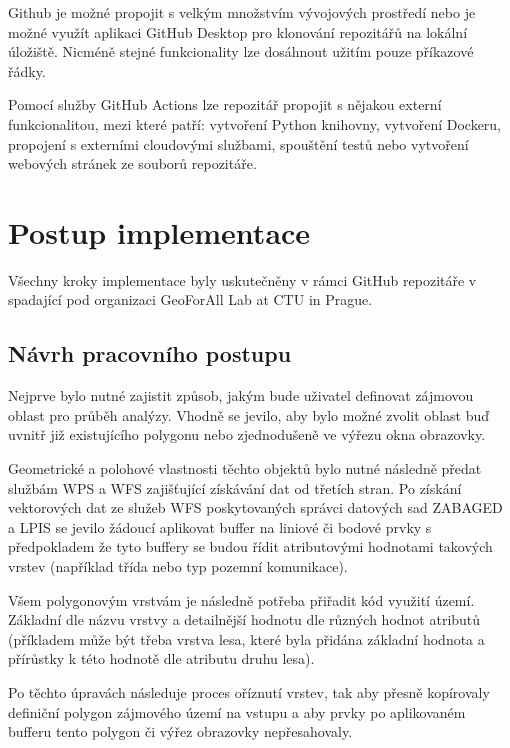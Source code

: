 \documentclass[a4paper,oneside,12pt]{book}
\begin{document}
\hspace{10mm}Github je možné propojit s velkým množstvím vývojových prostředí nebo je možné využít aplikaci GitHub Desktop pro klonování repozitářů na lokální úložiště. Nicméně stejné funkcionality lze dosáhnout užitím pouze
příkazové řádky. 

\hspace{10mm}Pomocí služby GitHub Actions lze repozitář propojit s nějakou externí funkcionalitou, mezi které patří: vytvoření Python knihovny, vytvoření Dockeru, propojení s externími cloudovými službami, spouštění testů nebo vytvoření webových stránek ze souborů repozitáře. 


\chapter{Postup implementace} \label{implementace}
\hspace{10mm}Všechny kroky implementace byly uskutečněny v rámci GitHub repozitáře v spadající pod organizaci GeoForAll Lab at CTU in Prague.

\section{Návrh pracovního postupu} \label{workflow}
\hspace{10mm}Nejprve bylo nutné zajistit způsob, jakým bude uživatel definovat zájmovou oblast pro průběh analýzy. Vhodně se jevilo, aby bylo možné zvolit oblast buď uvnitř již existujícího polygonu nebo zjednodušeně ve výřezu okna obrazovky.

\hspace{10mm}Geometrické a polohové vlastnosti těchto objektů bylo nutné následně předat službám WPS a WFS zajišťující získávání dat od třetích stran. Po získání vektorových dat ze služeb WFS poskytovaných správci datových sad ZABAGED a LPIS se jevilo žádoucí aplikovat buffer na liniové či bodové prvky s předpokladem že tyto buffery se budou řídit atributovými hodnotami takových vrstev (například třída nebo typ pozemní komunikace). 

\hspace{10mm}Všem polygonovým vrstvám je následně potřeba přiřadit kód využití území. Základní dle názvu vrstvy a detailnější hodnotu dle různých hodnot atributů (příkladem může být třeba vrstva lesa, které byla přidána základní hodnota a přírůstky k této hodnotě dle atributu druhu lesa).

\hspace{10mm}Po těchto úpravách následuje proces oříznutí vrstev, tak aby přesně kopírovaly definiční polygon zájmového území na vstupu a aby prvky po aplikovaném bufferu tento polygon či výřez obrazovky nepřesahovaly.
\end{document}
